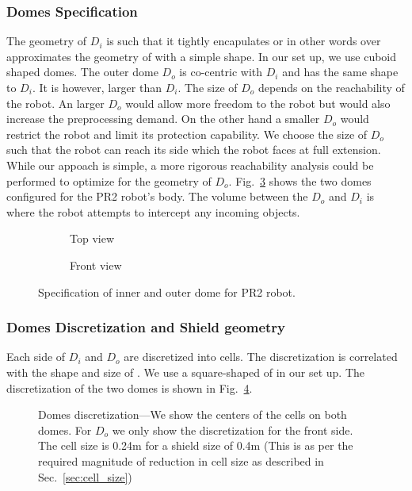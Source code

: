 \documentclass[a4paper]{report}
\begin{document}
\subsubsection{Domes Specification}
The geometry of $D_i$ is such that it tightly encapulates \calB or in other words over approximates the geometry of \calB with a simple shape. In our set up, we use cuboid shaped domes. The outer dome $D_o$ is co-centric with $D_i$ and has the same shape to $D_i$. It is however, larger than $D_i$. The size of $D_o$ depends on the reachability of the robot. An larger $D_o$ would allow more freedom to the robot but would also increase the preprocessing demand. On the other hand a smaller $D_o$ would restrict the robot and limit its protection capability.
We choose the size of $D_o$ such that the robot can reach its side which the robot faces at full extension. While our appoach is simple, a more rigorous reachability analysis could be performed to optimize for the geometry of $D_o$.
Fig.~\ref{fig:domes} shows the two domes configured for the PR2 robot's body. The volume between the $D_o$ and $D_i$ is where the robot attempts to intercept any incoming objects. 

\begin{figure}[H]
    \centering
    \begin{subfigure}{0.48\textwidth}
        \caption{Top view}
        \label{fig:domes_top}
    \end{subfigure} 
    \begin{subfigure}{0.48\textwidth}
        \caption{Front view}
        \label{fig:domes_front}
    \end{subfigure}
    \caption{
    Specification of inner and outer dome for PR2 robot.
    }
\label{fig:domes}
\end{figure}

\subsubsection{Domes Discretization and Shield geometry}
Each side of $D_i$ and $D_o$ are discretized into cells. The discretization is correlated with the shape and size of \calS. We use a square-shaped \calS of in our set up. The discretization of the two domes is shown in Fig.~\ref{fig:domes_disc}.
%

\begin{figure}[ht]
\centering
\caption{Domes discretization---We show the centers of the cells on both domes. For $D_o$ we only show the discretization for the front side. The cell size is 0.24m for a shield size of 0.4m (This is as per the required magnitude of reduction in cell size as described in Sec.~\ref{sec:cell_size})}
\label{fig:domes_disc}
\end{figure}
\end{document}

